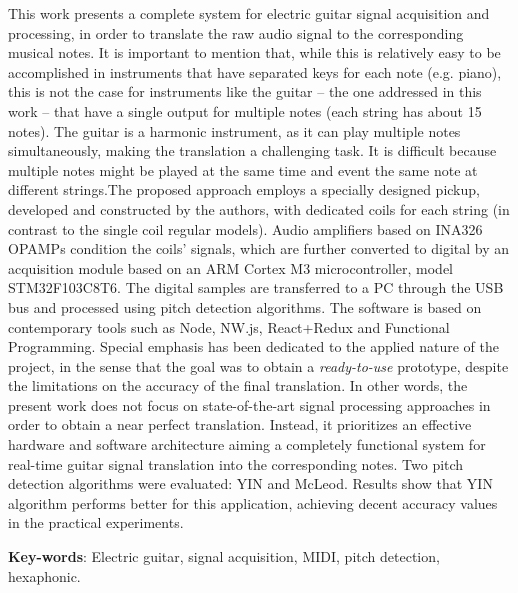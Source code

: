 \setlength{\absparsep}{18pt} %

\begin{summary}[Abstract]
This work presents a complete system for electric guitar signal acquisition and processing, in order to translate
the raw audio signal to the corresponding musical notes. It is important to mention that, while this is
relatively easy to be accomplished in instruments that have separated keys for each note (e.g. piano),
this is not the case for instruments like the guitar – the one addressed in this work – that have a single
output for multiple notes (each string has about 15 notes). The guitar is a harmonic instrument, as it can
play multiple notes simultaneously, making the translation a challenging task. It is difficult because
multiple notes might be played at the same time and event the same note at different strings.The proposed
approach employs a specially designed pickup, developed and constructed by the authors, with dedicated coils for
each string (in contrast to the single coil regular models). Audio amplifiers based on INA326 OPAMPs
condition the coils’ signals, which are further converted to digital by an acquisition module based on an
ARM Cortex M3 microcontroller, model STM32F103C8T6. The digital samples are transferred to a PC
through the USB bus and processed using pitch detection algorithms. The software is based on
contemporary tools such as Node, NW.js, React+Redux and Functional Programming. Special emphasis
has been dedicated to the applied nature of the project, in the sense that the goal was to obtain a
\emph{ready-to-use} prototype, despite the limitations on the accuracy of the final translation. In other
words, the present work does not focus on state-of-the-art signal processing approaches in order to
obtain a near perfect translation. Instead, it prioritizes an effective hardware and software architecture
aiming a completely functional system for real-time guitar signal translation into the corresponding
notes. Two pitch detection algorithms were evaluated: YIN and McLeod. Results show that YIN algorithm
performs better for this application, achieving decent accuracy values in the practical experiments.


  \textbf{Key-words}: Electric guitar, signal acquisition, MIDI, pitch detection, hexaphonic.
\end{summary}


